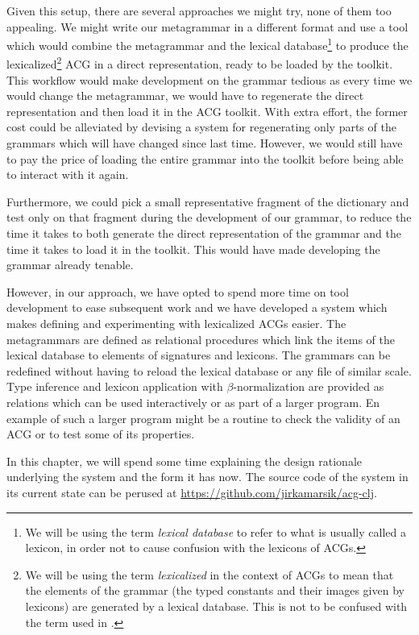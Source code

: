Given this setup, there are several approaches we might try, none of
them too appealing. We might write our metagrammar in a different format
and use a tool which would combine the metagrammar and the lexical
database\footnote{We will be using the term \emph{lexical database} to
  refer to what is usually called a lexicon, in order not to cause
  confusion with the lexicons of ACGs.} to produce the
lexicalized\footnote{We will be using the term \emph{lexicalized} in the
  context of ACGs to mean that the elements of the grammar (the typed
  constants and their images given by lexicons) are generated by a
  lexical database. This is not to be confused with the term used in
  \cite{yoshinaka2005complexity}.} ACG in a direct representation, ready
to be loaded by the toolkit. This workflow would make development on the
grammar tedious as every time we would change the metagrammar, we would
have to regenerate the direct representation and then load it in the ACG
toolkit. With extra effort, the former cost could be alleviated by
devising a system for regenerating only parts of the grammars which will
have changed since last time. However, we would still have to pay the
price of loading the entire grammar into the toolkit before being able
to interact with it again.

Furthermore, we could pick a small representative fragment of the
dictionary and test only on that fragment during the development of our
grammar, to reduce the time it takes to both generate the direct
representation of the grammar and the time it takes to load it in the
toolkit. This would have made developing the grammar already
tenable.

However, in our approach, we have opted to spend more time on tool
development to ease subsequent work and we have developed a system which
makes defining and experimenting with lexicalized ACGs easier. The
metagrammars are defined as relational procedures which link the items
of the lexical database to elements of signatures and lexicons. The
grammars can be redefined without having to reload the lexical database
or any file of similar scale. Type inference and lexicon application
with $\beta$-normalization are provided as relations which can be used
interactively or as part of a larger program. En example of such a
larger program might be a routine to check the validity of an ACG or to
test some of its properties.

In this chapter, we will spend some time explaining the design rationale
underlying the system and the form it has now. The source code of the
system in its current state can be perused at
\url{https://github.com/jirkamarsik/acg-clj}.

